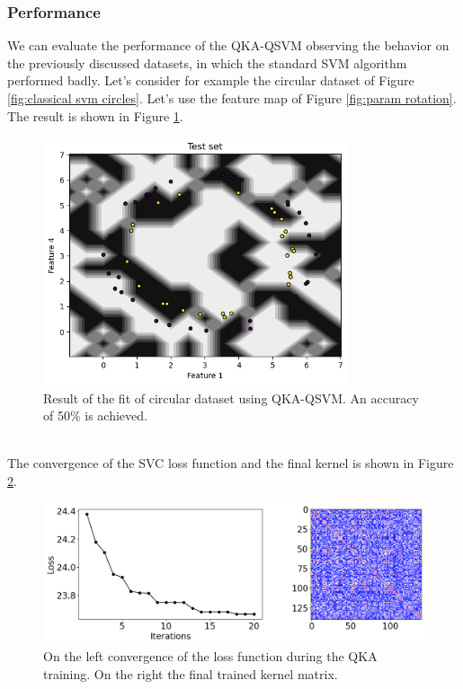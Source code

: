 \documentclass[12pt]{article}
\begin{document}
\subsubsection{Performance}
We can evaluate the performance of the QKA-QSVM observing the behavior on the previously discussed datasets, in which the standard SVM algorithm performed badly. 
Let's consider for example the circular dataset of Figure \ref{fig:classical svm circles}. Let's use the feature map of Figure \ref{fig:param rotation}. 
The result is shown in Figure \ref{fig:qka}.
\begin{figure}[h!]
    \centering
    \includegraphics[width=0.8\textwidth]{images/qka.png}
    \caption{Result of the fit of circular dataset using QKA-QSVM. An accuracy of 50\% is achieved.}
    \label{fig:qka}
\end{figure}\\
The convergence of the SVC loss function and the final kernel is shown in Figure \ref{fig:loss function}. 
\begin{figure}[h!]
    \centering
    \includegraphics[width=\textwidth]{images/lossfunction.png}
    \caption{On the left convergence of the loss function during the QKA training. On the right the final trained kernel matrix.}
    \label{fig:loss function}
\end{figure}
\end{document}
